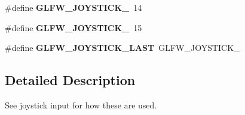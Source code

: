 \begin{DoxyCompactItemize}
\#define {\bfseries G\+L\+F\+W\+\_\+\+J\+O\+Y\+S\+T\+I\+C\+K\+\_}~14
\item 
\mbox{\label{group__joysticks_ga453edeeabf350827646b6857df4f80ce}} 
\#define {\bfseries G\+L\+F\+W\+\_\+\+J\+O\+Y\+S\+T\+I\+C\+K\+\_}~15
\item 
\mbox{\label{group__joysticks_ga9ca13ebf24c331dd98df17d84a4b72c9}} 
\#define {\bfseries G\+L\+F\+W\+\_\+\+J\+O\+Y\+S\+T\+I\+C\+K\+\_\+\+L\+A\+ST}~G\+L\+F\+W\+\_\+\+J\+O\+Y\+S\+T\+I\+C\+K\+\_
\end{DoxyCompactItemize}


\subsection{Detailed Description}
See joystick input for how these are used. 